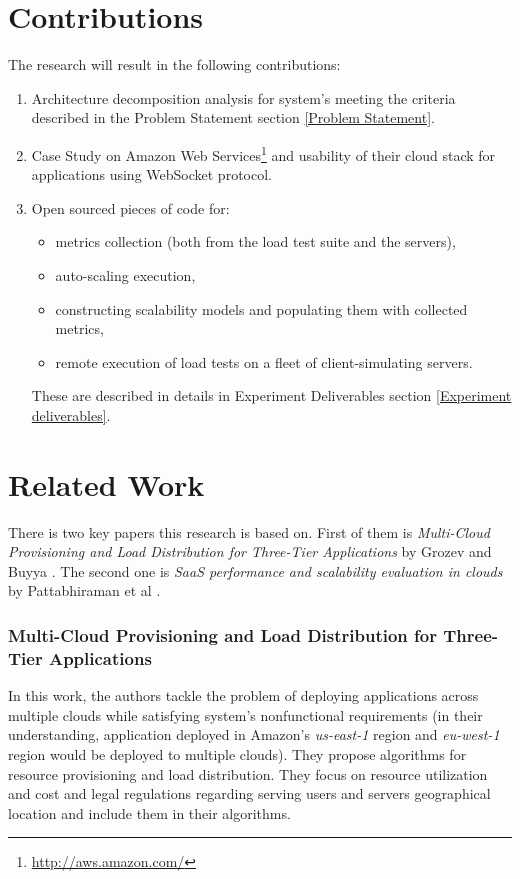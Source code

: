 \documentclass{uvamscse}
\begin{document}
\section{Contributions}
The research will result in the following contributions:

\begin{enumerate}
  \item Architecture decomposition analysis for system's meeting the criteria described in the Problem Statement section \ref{Problem Statement}.
  \item Case Study on Amazon Web Services\footnote{\url{http://aws.amazon.com/}} and usability of their cloud stack for applications using WebSocket protocol.
  \item Open sourced pieces of code for:
  \begin{itemize}
    \item metrics collection (both from the load test suite and the servers),
    \item auto-scaling execution,
    \item constructing scalability models and populating them with collected metrics,
    \item remote execution of load tests on a fleet of client-simulating servers.
  \end{itemize}
  These are described in details in Experiment Deliverables section \ref{Experiment deliverables}.
\end{enumerate}

\section{Related Work}\label{Related Work}

There is two key papers this research is based on. First of them is \textit{Multi-Cloud Provisioning and Load Distribution for Three-Tier Applications} by Grozev and Buyya \cite{GroBuy}. The second one is \textit{SaaS performance and scalability evaluation in clouds} by Pattabhiraman et al \cite{Models}.

\subsubsection{Multi-Cloud Provisioning and Load Distribution for Three-Tier Applications}

In this work, the authors tackle the problem of deploying applications across multiple clouds while satisfying system's nonfunctional requirements (in their understanding, application deployed in Amazon's \textit{us-east-1} region and \textit{eu-west-1} region would be deployed to multiple clouds). They propose algorithms for resource provisioning and load distribution. They focus on resource utilization and cost and legal regulations regarding serving users and servers geographical location and include them in their algorithms.
\end{document}
